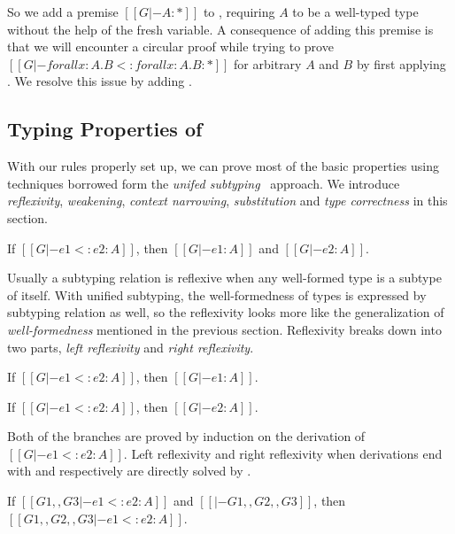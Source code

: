 So we add a premise $[[G |- A : *]]$ to ,
requiring $A$ to be a well-typed type without the help of the fresh variable.
A consequence of adding this premise is that we will encounter a circular proof
while trying to prove $[[G |- forall x : A. B <: forall x : A . B : *]]$ for
arbitrary $A$ and $B$ by first applying . We resolve this issue by
adding .

\subsection{Typing Properties of \name}

With our rules properly set up, we can prove most of the basic properties
using techniques borrowed form the \emph{unifed subtyping}~\cite{} approach.
We introduce \emph{reflexivity}, \emph{weakening},
\emph{context narrowing}, \emph{substitution} and \emph{type correctness}
in this section.

\begin{theorem}[Reflexivity]
   If $[[G |- e1 <: e2 : A]]$,
   then $[[G |- e1 : A]]$ and $[[G |- e2 : A]]$.
\end{theorem}

Usually a subtyping relation is reflexive when any well-formed type is a subtype
of itself. With unified subtyping, the well-formedness of types is expressed by
subtyping relation as well, so the reflexivity looks more like the generalization
of \emph{well-formedness} mentioned in the previous section. Reflexivity
breaks down into two parts, \emph{left reflexivity} and \emph{right reflexivity}.

\begin{lemma}
   If $[[G |- e1 <: e2 : A]]$,
   then $[[G |- e1 : A]]$.
\end{lemma}

\begin{lemma}
   If $[[G |- e1 <: e2 : A]]$,
   then $[[G |- e2 : A]]$.
\end{lemma}

\noindent Both of the branches are proved by induction on the derivation of
$[[G |- e1 <: e2 : A]]$.
Left reflexivity and right reflexivity when derivations end with 
and  respectively are directly solved by .

\begin{theorem}[Weakening]
    If $[[G1 ,, G3 |- e1 <: e2 : A]]$ and $[[|- G1 ,, G2 ,, G3]]$,
    then $[[G1 ,, G2 ,, G3 |- e1 <: e2 : A]]$.
\end{theorem}

